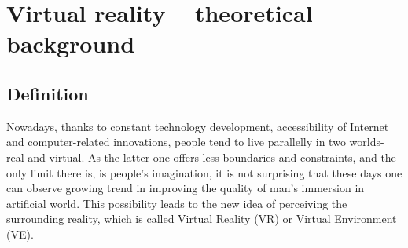 
\chapter{Virtual reality – theoretical background}\label{chapter1}  %


\ifpdf
    \graphicspath{{Chapter1/Figs/Raster/}{Chapter1/Figs/PDF/}{Chapter1/Figs/}}
\else
    \graphicspath{{Chapter1/Figs/Vector/}{Chapter1/Figs/}}
\fi


\section{Definition} %

	Nowadays, thanks to constant technology development, accessibility of Internet and computer-related innovations, people
tend to live parallelly in two worlds- real and virtual. As the latter one offers less boundaries and constraints, and the only limit there is, is people's imagination, it is not surprising that these days one can observe growing trend in improving the quality of man's immersion in artificial world. This possibility leads to the new idea of perceiving the surrounding reality, which is called Virtual Reality (VR) or Virtual Environment (VE).

